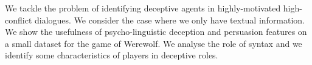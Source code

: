 We tackle the problem of identifying deceptive agents in highly-motivated high-conflict dialogues. We consider the case where we only have textual information. We show the usefulness of psycho-linguistic deception and persuasion features on a small dataset for the game of Werewolf. We analyse the role of syntax and we identify some characteristics of players in deceptive roles.
